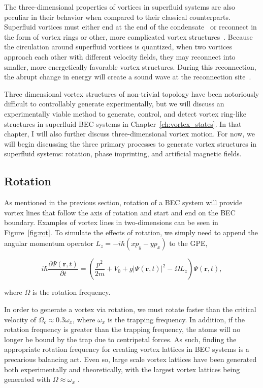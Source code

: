 The three-dimensional properties of vortices in superfluid systems are also peculiar in their behavior when compared to their classical counterparts.
Superfluid vortices must either end at the end of the condensate~\cite{madison2000} or reconnect in the form of vortex rings or other, more complicated vortex structures~\cite{reichl2013, barenghi2014}.
Because the circulation around superfluid vortices is quantized, when two vortices approach each other with different velocity fields, they may reconnect into smaller, more energetically favorable vortex structures.
During this reconnection, the abrupt change in energy will create a sound wave at the reconnection site~\cite{feynman1955}.

Three dimensional vortex structures of non-trivial topology have been notoriously difficult to controllably generate experimentally, but we will discuss an experimentally viable method to generate, control, and detect vortex ring-like structures in superfluid BEC systems in Chapter~\ref{ch:vortex_states}.
In that chapter, I will also further discuss three-dimensional vortex motion.
 For now, we will begin discussing the three primary processes to generate vortex structures in superfluid systems: rotation, phase imprinting, and artificial magnetic fields.

\subsection{Rotation}

\label{sec:rot}
As mentioned in the previous section, rotation of a BEC system will provide vortex lines that follow the axis of rotation and start and end on the BEC boundary.
Examples of vortex lines in two-dimensions can be seen in Figure~\ref{fig:rot}.
To simulate the effects of rotation, we simply need to append the angular momentum operator $L_z = -i\hbar(xp_y - yp_x)$ to the GPE,

\begin{equation}
i \hbar \frac{\partial \Psi(\mathbf{r},t)}{\partial t} = \left(\frac{p^2}{2m} + V_0 + g |\Psi(\mathbf{r},t)|^2 -\Omega L_z \right)\Psi(\mathbf{r},t),
\label{eqn:GPErot}
\end{equation}

\noindent where $\Omega$ is the rotation frequency. 


In order to generate a vortex via rotation, we must rotate faster than the critical velocity of $\Omega_c \approx 0.3 \omega_x$, where $\omega_x$ is the trapping frequency.
In addition, if the rotation frequency is greater than the trapping frequency, the atoms will no longer be bound by the trap due to centripetal forces.
As such, finding the appropriate rotation frequency for creating vortex lattices in BEC systems is a precarious balancing act.
Even so, large scale vortex lattices have been generated both experimentally and theoretically, with the largest vortex lattices being generated with $\Omega \approx \omega_x$ \cite{o2016, o2016topo, abo2001, schweikhard2004}.

